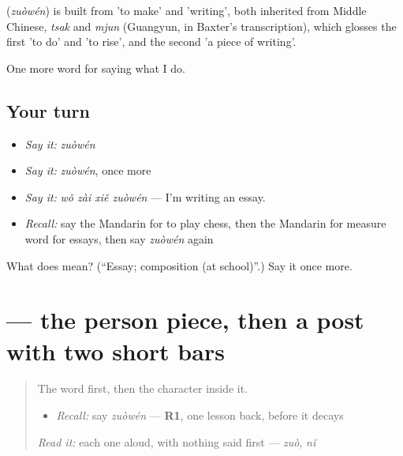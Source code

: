 \begin{cousinweb}
\textbf{} (\emph{zuòwén}) is built from  'to make' and  'writing', both inherited from Middle Chinese, \emph{tsak} and \emph{mjun} (Guangyun, in Baxter's transcription), which glosses the first 'to do' and 'to rise', and the second 'a piece of writing'.
\end{cousinweb}

\begin{grammarlens}[title={What you've built}]
One more word for saying what I do.
\end{grammarlens}

\subsection*{Your turn}
\begin{itemize}
\raggedright
  \item \emph{Say it:} \emph{zuòwén}
  \item \emph{Say it:} \emph{zuòwén}, once more
  \item \emph{Say it:} \emph{wǒ zài xiě zuòwén} — I'm writing an essay.
  \item \emph{Recall:} say the Mandarin for to play chess, then the Mandarin for measure word for essays, then say \emph{zuòwén} again
\end{itemize}

\begin{tcolorbox}[breakable,colback=teal!4,colframe=teal!35!black,title={Before you move on}]
What does  mean? (\textquotedblleft{}Essay; composition (at school)\textquotedblright{}.) Say it once more.
\end{tcolorbox}
\section[\texorpdfstring{\zh{作} (zuò)}{作 (zuò)}]{ — the person piece, then a post with two short bars}

\label{lesson:ZH-W251-zuo-do}



\begin{quote}
The word first, then the character inside it.

\begin{itemize}
\raggedright
  \item \emph{Recall:} say \emph{zuòwén} — \textbf{R1}, one lesson back, before it decays
\end{itemize}

\begin{quote}
 
\end{quote}

\emph{Read it:} each one aloud, with nothing said first — \emph{zuò}, \emph{nǐ}
\end{quote}

